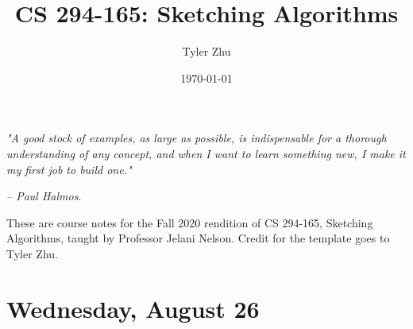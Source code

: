 \documentclass[11 pt]{scrartcl}
\begin{document}
 
\title{\Large CS 294-165: Sketching Algorithms}
\author{\large Tyler Zhu}
\date{\large\today}

\maketitle 

\begin{center}
\begin{displayquote}
    \emph{"A good stock of examples, as large as possible, is indispensable for a thorough understanding of any concept, and when I want to learn something new, I make it my first job to build one."} \\ \begin{flushright} \emph{– Paul Halmos}.  \end{flushright}
\end{displayquote}
\end{center}


These are course notes for the Fall 2020 rendition of CS 294-165, Sketching Algorithms, taught by Professor Jelani Nelson. Credit for the template goes to Tyler Zhu.

\tableofcontents 

\newpage

\section{Wednesday, August 26}
\end{document}
